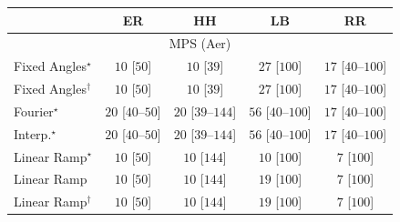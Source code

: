 \begin{tabular}{l|cccc|}
\toprule
            & ER & HH & LB & RR \\
\midrule
\multicolumn{5}{c}{\rule{0pt}{8pt}MPS (Aer)} \\
\midrule
Fixed Angles$^\star$ & {\cellcolor[HTML]{F7FCF5}} \color[HTML]{000000} $10$ [$50$] & {\cellcolor[HTML]{F7FCF5}} \color[HTML]{000000} $10$ [$39$] & {\cellcolor[HTML]{F4FBF1}} \color[HTML]{000000} $27$ [$100$] & {\cellcolor[HTML]{F5FBF3}} \color[HTML]{000000} $17$ [$40$--$100$] \\
Fixed Angles$^\dagger$ & {\cellcolor[HTML]{F7FCF5}} \color[HTML]{000000} $10$ [$50$] & {\cellcolor[HTML]{F7FCF5}} \color[HTML]{000000} $10$ [$39$] & {\cellcolor[HTML]{F4FBF1}} \color[HTML]{000000} $27$ [$100$] & {\cellcolor[HTML]{F5FBF3}} \color[HTML]{000000} $17$ [$40$--$100$] \\
Fourier$^\star$ & {\cellcolor[HTML]{F5FBF2}} \color[HTML]{000000} $20$ [$40$--$50$] & {\cellcolor[HTML]{F5FBF2}} \color[HTML]{000000} $20$ [$39$--$144$] & {\cellcolor[HTML]{EFF9EB}} \color[HTML]{000000} $56$ [$40$--$100$] & {\cellcolor[HTML]{F5FBF3}} \color[HTML]{000000} $17$ [$40$--$100$] \\
Interp.$^\star$ & {\cellcolor[HTML]{F5FBF2}} \color[HTML]{000000} $20$ [$40$--$50$] & {\cellcolor[HTML]{F5FBF2}} \color[HTML]{000000} $20$ [$39$--$144$] & {\cellcolor[HTML]{EFF9EB}} \color[HTML]{000000} $56$ [$40$--$100$] & {\cellcolor[HTML]{F5FBF3}} \color[HTML]{000000} $17$ [$40$--$100$] \\
Linear Ramp$^\star$ & {\cellcolor[HTML]{F7FCF5}} \color[HTML]{000000} $10$ [$50$] & {\cellcolor[HTML]{F7FCF5}} \color[HTML]{000000} $10$ [$144$] & {\cellcolor[HTML]{F7FCF5}} \color[HTML]{000000} $10$ [$100$] & {\cellcolor[HTML]{F7FCF5}} \color[HTML]{000000} $7$ [$100$] \\
Linear Ramp & {\cellcolor[HTML]{F7FCF5}} \color[HTML]{000000} $10$ [$50$] & {\cellcolor[HTML]{F7FCF5}} \color[HTML]{000000} $10$ [$144$] & {\cellcolor[HTML]{F5FBF3}} \color[HTML]{000000} $19$ [$100$] & {\cellcolor[HTML]{F7FCF5}} \color[HTML]{000000} $7$ [$100$] \\
Linear Ramp$^\dagger$ & {\cellcolor[HTML]{F7FCF5}} \color[HTML]{000000} $10$ [$50$] & {\cellcolor[HTML]{F7FCF5}} \color[HTML]{000000} $10$ [$144$] & {\cellcolor[HTML]{F5FBF3}} \color[HTML]{000000} $19$ [$100$] & {\cellcolor[HTML]{F7FCF5}} \color[HTML]{000000} $7$ [$100$] \\

\end{tabular}
